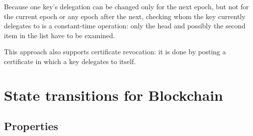 \documentclass[11pt,a4paper]{article}
\begin{document}
Because one key's delegation can be changed only for the next epoch, but
not for the current epoch or any epoch after the next, checking whom the key
currently delegates to is a constant-time operation: only the head and
possibly the second item in the list have to be examined.

This approach also supports certificate revocation: it is done by posting a
certificate in which a key delegates to itself.


\section{State transitions for Blockchain}
\label{sec:state-trans-chain}

\subsection{Properties}
\label{sec:chain-properties}
\end{document}
